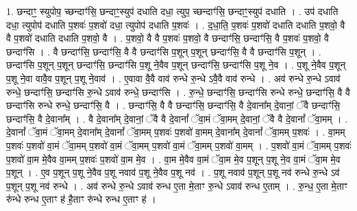 \documentclass[17pt]{extarticle}
\begin{document}
1. छन्दाꣳ॒॒ स्युपोप॒ च्छन्दाꣳ॑सि॒ छन्दाꣳ॒॒स्युप॑ दधाति दधा॒ त्युप॒ च्छन्दाꣳ॑सि॒ छन्दाꣳ॒॒स्युप॑ दधाति । . उप॑ दधाति दधा॒ त्युपोप॑ दधाति प॒शवः॑ प॒शवो॑ दधा॒ त्युपोप॑ दधाति प॒शवः॑ । . द॒धा॒ति॒ प॒शवः॑ प॒शवो॑ दधाति दधाति प॒शवो॒ वै वै प॒शवो॑ दधाति दधाति प॒शवो॒ वै । . प॒शवो॒ वै वै प॒शवः॑ प॒शवो॒ वै छन्दाꣳ॑सि॒ छन्दाꣳ॑सि॒ वै प॒शवः॑ प॒शवो॒ वै छन्दाꣳ॑सि । . वै छन्दाꣳ॑सि॒ छन्दाꣳ॑सि॒ वै वै छन्दाꣳ॑सि प॒शून् प॒शून् छन्दाꣳ॑सि॒ वै वै छन्दाꣳ॑सि प॒शून् । . छन्दाꣳ॑सि प॒शून् प॒शून् छन्दाꣳ॑सि॒ छन्दाꣳ॑सि प॒शू ने॒वैव प॒शून् छन्दाꣳ॑सि॒ छन्दाꣳ॑सि प॒शू ने॒व । . प॒शू ने॒वैव प॒शून् प॒शू ने॒वा वावै॒व प॒शून् प॒शू ने॒वाव॑ । . ए॒वावा वै॒वै वाव॑ रुन्धे रु॒न्धे ऽवै॒वै वाव॑ रुन्धे । . अव॑ रुन्धे रु॒न्धे ऽवाव॑ रुन्धे॒ छन्दाꣳ॑सि॒ छन्दाꣳ॑सि रु॒न्धे ऽवाव॑ रुन्धे॒ छन्दाꣳ॑सि । . रु॒न्धे॒ छन्दाꣳ॑सि॒ छन्दाꣳ॑सि रुन्धे रुन्धे॒ छन्दाꣳ॑सि॒ वै वै छन्दाꣳ॑सि रुन्धे रुन्धे॒ छन्दाꣳ॑सि॒ वै । . छन्दाꣳ॑सि॒ वै वै छन्दाꣳ॑सि॒ छन्दाꣳ॑सि॒ वै दे॒वाना᳚म् दे॒वानां॒ ॅवै छन्दाꣳ॑सि॒ छन्दाꣳ॑सि॒ वै दे॒वाना᳚म् । . वै दे॒वाना᳚म् दे॒वानां॒ ॅवै वै दे॒वानां᳚ ॅवा॒मं ॅवा॒मम् दे॒वानां॒ ॅवै वै दे॒वानां᳚ ॅवा॒मम् । . दे॒वानां᳚ ॅवा॒मं ॅवा॒मम् दे॒वाना᳚म् दे॒वानां᳚ ॅवा॒मम् प॒शवः॑ प॒शवो॑ वा॒मम् दे॒वाना᳚म् दे॒वानां᳚ ॅवा॒मम् प॒शवः॑ । . वा॒मम् प॒शवः॑ प॒शवो॑ वा॒मं ॅवा॒मम् प॒शवो॑ वा॒मं ॅवा॒मम् प॒शवो॑ वा॒मं ॅवा॒मम् प॒शवो॑ वा॒मम् । . प॒शवो॑ वा॒मं ॅवा॒मम् प॒शवः॑ प॒शवो॑ वा॒म मे॒वैव वा॒मम् प॒शवः॑ प॒शवो॑ वा॒म मे॒व । . वा॒म मे॒वैव वा॒मं ॅवा॒म मे॒व प॒शून् प॒शू ने॒व वा॒मं ॅवा॒म मे॒व प॒शून् । . ए॒व प॒शून् प॒शू ने॒वैव प॒शू नवाव॑ प॒शू ने॒वैव प॒शू नव॑ । . प॒शू नवाव॑ प॒शून् प॒शू नव॑ रुन्धे रु॒न्धे ऽव॑ प॒शून् प॒शू नव॑ रुन्धे । . अव॑ रुन्धे रु॒न्धे ऽवाव॑ रुन्ध ए॒ता मे॒ताꣳ रु॒न्धे ऽवाव॑ रुन्ध ए॒ताम् । . रु॒न्ध॒ ए॒ता मे॒ताꣳ रु॑न्धे रुन्ध ए॒ताꣳ ह॑ है॒ताꣳ रु॑न्धे रुन्ध ए॒ताꣳ ह॑ । \newline
\end{document}
